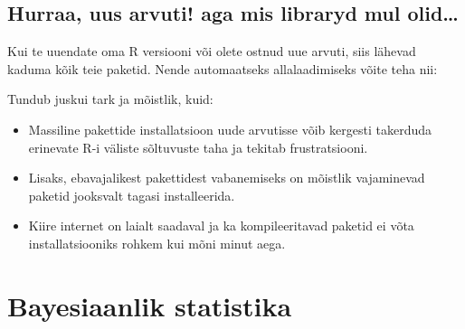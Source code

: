 \documentclass[]{book}
\newenvironment{Shaded}{\begin{snugshade}}{\end{snugshade}}
\newcommand{\KeywordTok}[1]{\textcolor[rgb]{0.13,0.29,0.53}{\textbf{#1}}}
\newcommand{\StringTok}[1]{\textcolor[rgb]{0.31,0.60,0.02}{#1}}
\newcommand{\OperatorTok}[1]{\textcolor[rgb]{0.81,0.36,0.00}{\textbf{#1}}}
\newcommand{\NormalTok}[1]{#1}
\providecommand{\tightlist}{%
  \setlength{\itemsep}{0pt}\setlength{\parskip}{0pt}}
\begin{document}
\section{Hurraa, uus arvuti! aga mis libraryd mul
olid\ldots{}}\label{hurraa-uus-arvuti-aga-mis-libraryd-mul-olid}

Kui te uuendate oma R versiooni või olete ostnud uue arvuti, siis
lähevad kaduma kõik teie paketid. Nende automaatseks allalaadimiseks
võite teha nii:

\begin{Shaded}
\end{Shaded}

Tundub juskui tark ja mõistlik, kuid:

\begin{itemize}
\tightlist
\item
  Massiline pakettide installatsioon uude arvutisse võib kergesti
  takerduda erinevate R-i väliste sõltuvuste taha ja tekitab
  frustratsiooni.
\item
  Lisaks, ebavajalikest pakettidest vabanemiseks on mõistlik vajaminevad
  paketid jooksvalt tagasi installeerida.
\item
  Kiire internet on laialt saadaval ja ka kompileeritavad paketid ei
  võta installatsiooniks rohkem kui mõni minut aega.
\end{itemize}

\chapter{Bayesiaanlik statistika}\label{bayesiaanlik-statistika}
\end{document}
